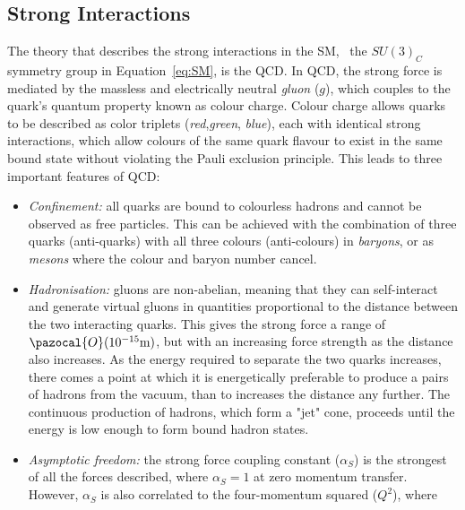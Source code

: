 	\subsection*{Strong Interactions}
	The theory that describes the strong interactions in the \ac{SM}, \ie\ the $SU(3)_C$ symmetry group in Equation~\ref{eq:SM}, is the \ac{QCD}.
	In \ac{QCD}, the strong force is mediated by the massless and electrically neutral \textit{gluon} ($g$), which couples to the quark's quantum property known as colour charge.
	Colour charge allows quarks to be described as color triplets (\textit{red},\textit{green}, \textit{blue}), each with identical strong interactions, which allow colours of the same quark flavour to exist in the same bound state without violating the Pauli exclusion principle.
	This leads to three important features of \ac{QCD}:
	\begin{itemize}
	\item[]\textit{Confinement:} all quarks are bound to colourless hadrons and cannot be observed as free particles.  This can be achieved with the combination of three quarks (anti-quarks) with all three colours (anti-colours) in \textit{baryons}, or as \textit{mesons} where the colour and baryon number cancel.
	 \item[]\textit{Hadronisation:} gluons are non-abelian, meaning that they can self-interact and generate virtual gluons in quantities proportional to the distance between the two interacting quarks. This gives the strong force a range of $\pazocal{O}(10^{-15}\mathrm{m})$, but with an increasing force strength as the distance also increases.
	As the energy required to separate the two quarks increases, there comes a point at which it is energetically preferable to produce a pairs of hadrons from the vacuum, than to increases the distance any further. The continuous production of hadrons, which form a "jet" cone, proceeds until the energy is low enough to form bound hadron states.
	\item[]\textit{Asymptotic freedom:} the strong force coupling constant ($\alpha_S$) is the strongest of all the forces described, where $\alpha_S=1$ at zero momentum transfer.
	 However, $\alpha_S$ is also correlated to the four-momentum squared ($Q^2$), where

\end{itemize}
